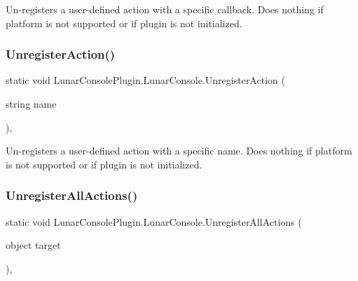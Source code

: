 Un-\/registers a user-\/defined action with a specific callback. Does nothing if platform is not supported or if plugin is not initialized. 

\mbox{\label{class_lunar_console_plugin_1_1_lunar_console_a6ae8fe8759e61b25508a43cdadca35c4}} 
\subsubsection{\texorpdfstring{Unregister\+Action()}{UnregisterAction()}\hspace{0.1cm}{\footnotesize\ttfamily [2/2]}}
{\footnotesize\ttfamily static void Lunar\+Console\+Plugin.\+Lunar\+Console.\+Unregister\+Action (\begin{DoxyParamCaption}\item[{string}]{name }\end{DoxyParamCaption})\hspace{0.3cm}{\ttfamily [inline]}, {\ttfamily [static]}}



Un-\/registers a user-\/defined action with a specific name. Does nothing if platform is not supported or if plugin is not initialized. 

\mbox{\label{class_lunar_console_plugin_1_1_lunar_console_a27c043192646c8a5b79668e2161db4aa}} 
\subsubsection{\texorpdfstring{Unregister\+All\+Actions()}{UnregisterAllActions()}}
{\footnotesize\ttfamily static void Lunar\+Console\+Plugin.\+Lunar\+Console.\+Unregister\+All\+Actions (\begin{DoxyParamCaption}\item[{object}]{target }\end{DoxyParamCaption})\hspace{0.3cm}{\ttfamily [inline]}, {\ttfamily [static]}}



